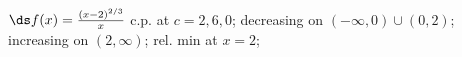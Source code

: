 {$\ds f(x) =\frac{(x-2)^{2/3}}{x}$
}
{c.p. at $c=2,6,0$; 
decreasing on $(-\infty,0)\cup (0,2)$;
increasing on $(2,\infty)$;
rel. min at $x=2$;
}

